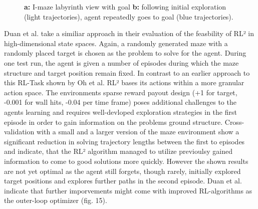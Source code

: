 \documentclass[letterpaper, 10 pt, conference]{ieeeconf}  %
\begin{document}
\begin{figure}[thpb]
        \centering
  \caption{\textbf{a:} I-maze labyrinth view with goal \newline
  \textbf{b:} following initial exploration
  (light trajectories), agent repeatedly goes to goal (blue trajectories). \cite{wangLearningReinforcementLearn2016}
  }
        \label{figurelabel}
     \end{figure}

Duan et al.\cite{duanRLFastReinforcement2016} take a similiar approach in their 
evaluation of the feasbility of RL² in high-dimensional state spaces. Again, a randomly generated 
maze with a randomly placed target is chosen as the problem to solve for the agent. During one test run, the agent is given a number 
of episodes during which the maze structure and target position remain fixed. In contrast to an earlier approach to this RL-Task shown by Oh et al.
\cite{ohZeroShotTaskGeneralization2017} 
RL² bases its actions within a more granular action space. The environments sparse reward payout design (+1 for target, 
-0.001 for wall hits, -0.04 per time frame) poses additional challenges to the agents learning and requires well-devloped exploration strategies 
in the first episode in order to gain information on the problems ground structure. Cross-validation with a small and a larger version of the 
maze environment show a significant reduction in solving trajectory lengths between the first to episodes and indicate, that the RL² algorithm 
managed to utilize previoulsy gained information to come to good solutions more quickly. However the shown results are not yet optimal
as the agent still forgets, though rarely, initially explored target positions and explores further paths in the second episode. Duan et al. 
indicate that further imporvements might come with improved RL-algorithms as the outer-loop optimizer (fig. 15). 
\end{document}

